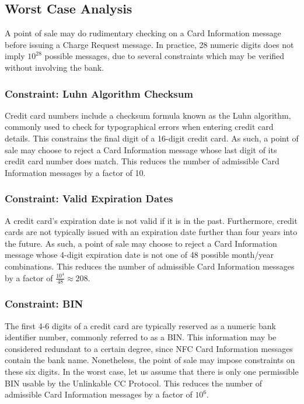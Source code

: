 \subsection{Worst Case Analysis}
\label{sec:analysis_worstcase}

A point of sale may do rudimentary checking on a Card Information message before issuing a Charge Request message.
In practice, 28 numeric digits does not imply $10^{28}$ possible messages, due to several constraints which may be verified without involving the bank.

\subsubsection*{Constraint: Luhn Algorithm Checksum}

Credit card numbers include a checksum formula known as the Luhn algorithm, commonly used to check for typographical errors when entering credit card details.
This constrains the final digit of a 16-digit credit card.
As such, a point of sale may choose to reject a Card Information message whose last digit of its credit card number does match.
This reduces the number of admissible Card Information messages by a factor of 10.

\subsubsection*{Constraint: Valid Expiration Dates}

A credit card's expiration date is not valid if it is in the past.
Furthermore, credit cards are not typically issued with an expiration date further than four years into the future.
As such, a point of sale may choose to reject a Card Information message whose 4-digit expiration date is not one of 48 possible month/year combinations.
This reduces the number of admissible Card Information messages by a factor of $\frac{10^4}{48} \approx 208$.

\subsubsection*{Constraint: BIN}

The first 4-6 digits of a credit card are typically reserved as a numeric bank identifier number, commonly referred to as a BIN.
This information may be considered redundant to a certain degree, since NFC Card Information messages contain the bank name.
Nonetheless, the point of sale may impose constraints on these six digits.
In the worst case, let us assume that there is only one permissible BIN usable by the Unlinkable CC Protocol.
This reduces the number of admissible Card Information messages by a factor of $10^6$.


